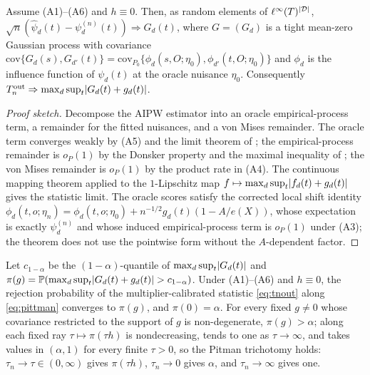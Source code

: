 \begin{theorem}
\label{thm:local-limit}
Assume (A1)--(A6) and $h\equiv0$. Then, as random elements of $\ell^\infty(T)^{\lvert \mathcal D\rvert}$, $\sqrt n(\widehat\psi_d(t)-\psi^{(n)}_d(t))\Rightarrow G_d(t)$, where $G=(G_d)$ is a tight mean-zero Gaussian process with covariance $\mathrm{cov}\{G_d(s),G_{d'}(t)\}=\mathrm{cov}_{P_0}\{\phi_d(s,O;\eta_0),\phi_{d'}(t,O;\eta_0)\}$ and $\phi_d$ is the influence function of $\psi_d(t)$ at the oracle nuisance $\eta_0$. Consequently $T_n^{\mathrm{out}}\Rightarrow\max_d\sup_t\lvert G_d(t)+g_d(t)\rvert$.
\end{theorem}

\begin{proof}[Proof sketch]
Decompose the AIPW estimator into an oracle empirical-process term, a remainder for the fitted nuisances, and a von Mises remainder. The oracle term converges weakly by (A5) and the limit theorem of \citet{kim_lee_tce_2026}; the empirical-process remainder is $o_P(1)$ by the Donsker property and the maximal inequality of \citet{kennedy_balakrishnan_gsell_2020}; the von Mises remainder is $o_P(1)$ by the product rate in (A4). The continuous mapping theorem applied to the $1$-Lipschitz map $f\mapsto\max_d\sup_t\lvert f_d(t)+g_d(t)\rvert$ gives the statistic limit. The oracle scores satisfy the corrected local shift identity $\phi_d(t,o;\eta_n)=\phi_d(t,o;\eta_0)+n^{-1/2}g_d(t)(1-A/e(X))$, whose expectation is exactly $\psi^{(n)}_d$ and whose induced empirical-process term is $o_P(1)$ under (A3); the theorem does not use the pointwise form without the $A$-dependent factor.
\end{proof}

\begin{theorem}
\label{thm:local-power}
Let $c_{1-\alpha}$ be the $(1-\alpha)$-quantile of $\max_d\sup_t\lvert G_d(t)\rvert$ and $\pi(g)=\mathbb{P}(\max_d\sup_t\lvert G_d(t)+g_d(t)\rvert>c_{1-\alpha})$. Under (A1)--(A6) and $h\equiv0$, the rejection probability of the multiplier-calibrated statistic \eqref{eq:tnout} along \eqref{eq:pittman} converges to $\pi(g)$, and $\pi(0)=\alpha$. For every fixed $g\ne0$ whose covariance restricted to the support of $g$ is non-degenerate, $\pi(g)>\alpha$; along each fixed ray $\tau\mapsto\pi(\tau h)$ is nondecreasing, tends to one as $\tau\to\infty$, and takes values in $(\alpha,1)$ for every finite $\tau>0$, so the Pitman trichotomy holds: $\tau_n\to\tau\in(0,\infty)$ gives $\pi(\tau h)$, $\tau_n\to0$ gives $\alpha$, and $\tau_n\to\infty$ gives one.
\end{theorem}


